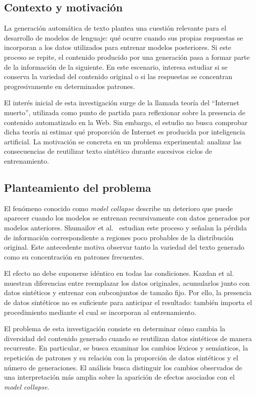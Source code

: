 \documentclass[12pt,letterpaper]{article}
\begin{document}
\subsection{Contexto y motivación}

La generación automática de texto plantea una cuestión relevante para el
desarrollo de modelos de lenguaje: qué ocurre cuando sus propias respuestas
se incorporan a los datos utilizados para entrenar modelos posteriores.
Si este proceso se repite, el contenido producido por una generación pasa
a formar parte de la información de la siguiente. En este escenario,
interesa estudiar si se conserva la variedad del contenido original o si
las respuestas se concentran progresivamente en determinados patrones.

El interés inicial de esta investigación surge de la llamada teoría del
``Internet muerto'', utilizada como punto de partida para reflexionar sobre
la presencia de contenido automatizado en la Web. Sin embargo, el estudio
no busca comprobar dicha teoría ni estimar qué proporción de Internet es
producida por inteligencia artificial. La motivación se concreta en un
problema experimental: analizar las consecuencias de reutilizar texto
sintético durante sucesivos ciclos de entrenamiento.

\subsection{Planteamiento del problema}

El fenómeno conocido como \textit{model collapse} describe un deterioro que
puede aparecer cuando los modelos se entrenan recursivamente con datos
generados por modelos anteriores. Shumailov et al.\ \cite{shumailov2024}
estudian este proceso y señalan la pérdida de información correspondiente
a regiones poco probables de la distribución original. Este antecedente
motiva observar tanto la variedad del texto generado como su concentración
en patrones frecuentes.

El efecto no debe suponerse idéntico en todas las condiciones. Kazdan
et al.\ \cite{kazdan2025} muestran diferencias entre reemplazar los datos
originales, acumularlos junto con datos sintéticos y entrenar con
subconjuntos de tamaño fijo. Por ello, la presencia de datos sintéticos no
es suficiente para anticipar el resultado: también importa el procedimiento
mediante el cual se incorporan al entrenamiento.

El problema de esta investigación consiste en determinar cómo cambia la
diversidad del contenido generado cuando se reutilizan datos sintéticos de
manera recurrente. En particular, se busca examinar los cambios léxicos y
semánticos, la repetición de patrones y su relación con la proporción de
datos sintéticos y el número de generaciones. El análisis busca
distinguir los cambios observados de una interpretación más amplia sobre
la aparición de efectos asociados con el \textit{model collapse}.
\end{document}
